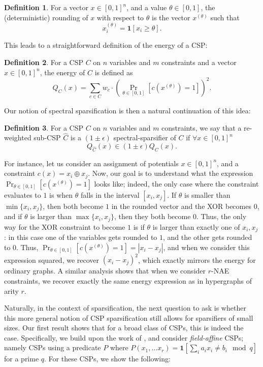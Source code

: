 \documentclass[11pt]{article}
\theoremstyle{definition}
\newtheorem{definition}{Definition}[section]
\newcommand{\eps}{\epsilon}
\begin{document}
\begin{definition}
    For a vector $x \in [0,1]^n$, and a value $\theta \in [0,1]$, the (deterministic) rounding of $x$ with respect to $\theta$ is the vector $x^{(\theta)}$ such that
    \[
    x^{(\theta)}_i = \mathbf{1}[x_i \geq \theta].
    \]
\end{definition}

This leads to a straightforward definition of the energy of a CSP:

\begin{definition}
    For a CSP $C$ on $n$ variables and $m$ constraints and a vector $x \in [0,1]^n$, the energy of $C$ is defined as 
    \[
    Q_C(x) = \sum_{c \in C} w_c \cdot \left(\Pr_{\theta \in [0,1]}[c(x^{(\theta)}) = 1] \right)^2.
    \]
\end{definition}

Our notion of spectral sparsification is then a natural continuation of this idea:

\begin{definition}
    For a CSP $C$ on $n$ variables and $m$ constraints, we say that a re-weighted sub-CSP $\hat{C}$ is a $(1 \pm \eps)$ spectral-sparsifier of $C$ if $\forall x \in [0,1]^n$
    \[
    Q_{\hat{C}}(x) \in (1 \pm \eps)Q_{C}(x).
    \]
\end{definition}

For instance, let us consider an assignment of potentials $x \in [0,1]^n$, and a constraint $c(x) = x_i \oplus x_j$. Now, our goal is to understand what the expression $\Pr_{\theta \in [0,1]}[c(x^{(\theta)}) = 1]$ looks like; indeed, the only case where the constraint evaluates to $1$ is when $\theta$ falls in the interval $[x_i, x_j]$. If $\theta$ is smaller than $\min\{ x_i, x_j \}$, then both become $1$ in the rounded vector and the XOR becomes $0$, and if $\theta$ is larger than $\max\{ x_i, x_j \}$, then they both become $0$. Thus, the only way for the XOR constraint to become $1$ is if $\theta$ is larger than exactly one of $x_i, x_j$: in this case one of the variables gets rounded to $1$, and the other gets rounded to $0$. Thus, $\Pr_{\theta \in [0,1]}[c(x^{(\theta)}) = 1] = |x_i - x_j|$, and when we consider this expression squared, we recover $(x_i - x_j)^2$, which exactly mirrors the energy for ordinary graphs. A similar analysis shows that when we consider $r$-NAE constraints, we recover exactly the same energy expression as in hypergraphs of arity $r$. 

Naturally, in the context of sparsification, the next question to ask is whether this more general notion of CSP sparsification still allows for sparsifiers of small sizes. Our first result shows that for a broad class of CSPs, this is indeed the case. Specifically, we build upon the work of \cite{KPS24}, and consider \emph{field-affine} CSPs; namely CSPs using a predicate $P$ where $P(x_1, \dots x_r)  = \mathbf{1}[\sum_{i} a_i x_i \neq b_i \mod q]$ for a prime $q$. For these CSPs, we show the following:
\end{document}
